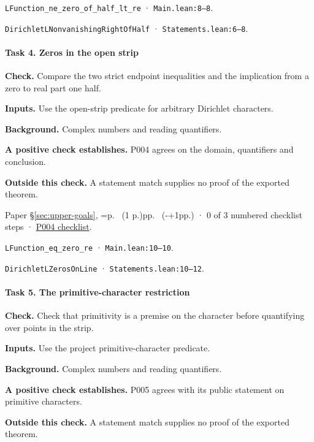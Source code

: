 \nolinkurl{LFunction_ne_zero_of_half_lt_re} · \nolinkurl{Main.lean:8–8}.

\nolinkurl{DirichletLNonvanishingRightOfHalf} · \nolinkurl{Statements.lean:6–8}.

\paragraph{Task 4. Zeros in the open strip}\label{v7:task-4}

\textbf{Check.} Compare the two strict endpoint inequalities and the implication from a zero to real part one half.

\textbf{Inputs.} Use the open-strip predicate for arbitrary Dirichlet characters.

\textbf{Background.} Complex numbers and reading quantifiers.

\textbf{A positive check establishes.} P004 agrees on the domain, quantifiers and conclusion.

\textbf{Outside this check.} A statement match supplies no proof of the exported theorem.

Paper \S\ref{sec:upper-goals}, \ifnum{}=\relax p.\ \pageref{pn:P004} (1 p.)\else pp.\ \pageref{pn:P004} (\number\numexpr{}-+1\relax pp.)\fi{} · 0 of 3 numbered checklist steps · \href{https://github.com/GunheeC/rh-lean-verification-atlas/blob/v0.1.0/units/P004.check.md}{P004 checklist}.

\nolinkurl{LFunction_eq_zero_re} · \nolinkurl{Main.lean:10–10}.

\nolinkurl{DirichletLZerosOnLine} · \nolinkurl{Statements.lean:10–12}.

\paragraph{Task 5. The primitive-character restriction}\label{v7:task-5}

\textbf{Check.} Check that primitivity is a premise on the character before quantifying over points in the strip.

\textbf{Inputs.} Use the project primitive-character predicate.

\textbf{Background.} Complex numbers and reading quantifiers.

\textbf{A positive check establishes.} P005 agrees with its public statement on primitive characters.

\textbf{Outside this check.} A statement match supplies no proof of the exported theorem.

